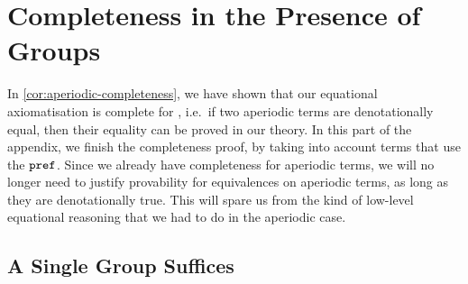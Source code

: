 \section{Completeness in the Presence of Groups}
\label{sec:completeness-in-the-presence-of-groups}

\newcommand{\checkterm}{\mathsf{check}}
\newcommand{\precheckterm}{\mathsf{precheck}}
\newcommand{\repairterm}{\mathsf{repair}}
\newcommand{\postrepairterm}{\mathsf{postrepair}}

In \cref{cor:aperiodic-completeness}, we have shown that our equational axiomatisation is complete for , i.e.~if two aperiodic terms are denotationally equal, then their equality can be proved in our theory. 
In this part of the appendix, we finish the completeness proof, by taking into account terms that  use the  $\mathtt{pref}$. Since we already have completeness for aperiodic terms, we will no longer need to justify provability for equivalences on aperiodic terms, as long as they are denotationally true. This will spare us from the kind of low-level equational reasoning that we had to do in the aperiodic case.

\subsection{A Single Group Suffices}

